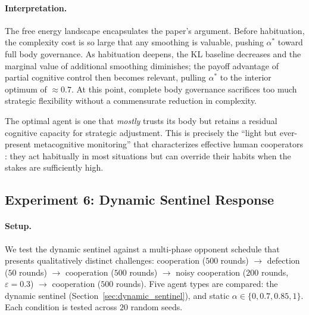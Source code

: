 \documentclass[11pt,a4paper]{article}
\theoremstyle{definition}
\begin{document}
\paragraph{Interpretation.}
The free energy landscape encapsulates the paper's argument.
Before habituation, the complexity cost is so large that any smoothing
is valuable, pushing $\alpha^{*}$ toward full body governance.  As
habituation deepens, the KL baseline decreases and the marginal value of
additional smoothing diminishes; the payoff advantage of partial cognitive
control then becomes relevant, pulling $\alpha^{*}$ to the interior
optimum of $\approx 0.7$.  At this point, complete body governance
sacrifices too much strategic flexibility without a commensurate
reduction in complexity.

The optimal agent is one that \emph{mostly} trusts its body but retains a
residual cognitive capacity for strategic adjustment.  This is precisely the
``light but ever-present metacognitive monitoring'' that characterizes effective
human cooperators \citep{dolan2013, daw2005}: they act habitually in most
situations but can override their habits when the stakes are sufficiently high.

\subsection{Experiment 6: Dynamic Sentinel Response}
\label{sec:exp_dynamic}

\paragraph{Setup.}
We test the dynamic sentinel against a multi-phase opponent schedule that
presents qualitatively distinct challenges:
cooperation ($500$ rounds) $\to$ defection ($50$ rounds) $\to$ cooperation
($500$ rounds) $\to$ noisy cooperation ($200$ rounds, $\varepsilon = 0.3$)
$\to$ cooperation ($500$ rounds).
Five agent types are compared: the dynamic sentinel
(Section~\ref{sec:dynamic_sentinel}), and static $\alpha \in \{0, 0.7, 0.85, 1\}$.
Each condition is tested across $20$ random seeds.
\end{document}
